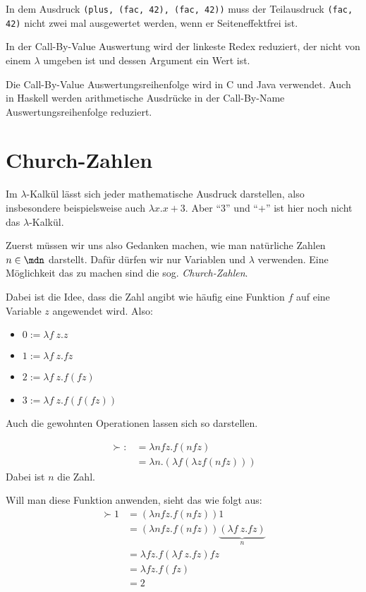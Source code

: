 \begin{beispiel}[Sharing]
    In dem Ausdruck \texttt{(plus, (fac, 42), (fac, 42))} muss der Teilausdruck
    \texttt{(fac, 42)} nicht zwei mal ausgewertet werden, wenn er Seiteneffektfrei 
    ist.
\end{beispiel}

\begin{definition}%
    In der Call-By-Value Auswertung wird der linkeste Redex reduziert, der
    nicht von einem $\lambda$ umgeben ist und dessen Argument ein Wert ist.
\end{definition}

Die Call-By-Value Auswertungsreihenfolge wird in C und Java verwendet.
Auch in Haskell werden arithmetische Ausdrücke in der Call-By-Name Auswertungsreihenfolge reduziert.

\section{Church-Zahlen}
Im $\lambda$-Kalkül lässt sich jeder mathematische Ausdruck darstellen, also 
insbesondere beispielsweise auch $\lambda x. x+3$. Aber \enquote{$3$} und
\enquote{$+$} ist hier noch nicht das $\lambda$-Kalkül.

Zuerst müssen wir uns also Gedanken machen, wie man natürliche Zahlen $n \in \mdn$
darstellt. Dafür dürfen wir nur Variablen und $\lambda$ verwenden. Eine Möglichkeit
das zu machen sind die sog. \textit{Church-Zahlen}.

Dabei ist die Idee, dass die Zahl angibt wie häufig eine Funktion $f$ auf eine
Variable $z$ angewendet wird. Also:
\begin{itemize}
    \item $0 := \lambda f~z. z$
    \item $1 := \lambda f~z. f z$
    \item $2 := \lambda f~z. f (f z)$
    \item $3 := \lambda f~z. f (f (f z))$
\end{itemize}

Auch die gewohnten Operationen lassen sich so darstellen.

\begin{beispiel}
    \begin{align*}
        \succ :&= \lambda n f z. f (n f z)\\
               &= \lambda n. (\lambda f  (\lambda z f (n f z)))
    \end{align*}
    Dabei ist $n$ die Zahl. 

    Will man diese Funktion anwenden, sieht das wie folgt aus:
    \begin{align*}
    \succ 1&= (\lambda n f z. f(n f z)) 1\\
           &= (\lambda n f z. f(n f z)) \underbrace{(\lambda f~z. f z)}_{n}\\
           &= \lambda f z. f (\lambda f~z. f z) f z\\
           &= \lambda f z. f (f z)\\
           &= 2
    \end{align*}
\end{beispiel}

